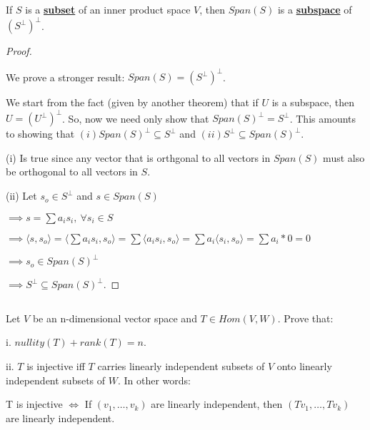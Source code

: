 \documentclass{article}
\newenvironment{customthm}[1]
  {\renewcommand\theinnercustomthm{#1}\innercustomthm}
  {\endinnercustomthm}
\begin{document}
\begin{customthm}{5}[2023.S(1.A.v)]
  $ $

  If $S$ is a \textbf{\underline{subset}} of an inner product space $V$, then $Span(S)$ is a \textbf{\underline{subspace}} of $(S^\perp)^\perp$.

\end{customthm}

\begin{proof}
  $ $

  We prove a stronger result:  $Span(S) = (S^\perp)^\perp$.
  \newline
  
  We start from the fact (given by another theorem) that if $U$ is a subspace, then $U = (U^\perp)^\perp$. So, now we need only show that $Span(S)^\perp = S^\perp$. This amounts to showing that $(i) Span(S)^\perp \subseteq S^\perp$ and $(ii) S^\perp \subseteq Span(S)^\perp$.
  \newline

  (i) Is true since any vector that is orthgonal to all vectors in $Span(S)$ must also be orthogonal to all vectors in $S$.
  \newline

  (ii) Let $s_o \in S^\perp$ and $s \in Span(S)$

  \noindent
  $\implies s = \sum a_i s_i, \ \forall s_i \in S$

  \noindent
  $\implies \langle s, s_o \rangle = \langle \sum a_i s_i, s_o \rangle = \sum \langle a_i s_i, s_o \rangle = \sum a_i \langle s_i, s_o \rangle = \sum a_i * 0 = 0$

  \noindent
  $\implies s_o \in Span(S)^\perp$

  \noindent
  $\implies S^\perp \subseteq Span(S)^\perp$.

\end{proof}
\newpage

\begin{customthm}{6}[2023.S(1.B), 2022.S(1.A.ii)]
  $ $

  Let $V$ be an n-dimensional vector space and $T \in Hom(V, W)$. Prove that:

  i. $nullity(T) + rank(T) = n$.

  ii. $T$ is injective iff $T$ carries linearly independent subsets of $V$ onto linearly independent subsets of $W$. In other words:

  T is injective $\iff$ If $(v_1,\ldots,v_k)$ are linearly independent, then $(Tv_1,\ldots,Tv_k)$ are linearly independent.

\end{customthm}
\end{document}
